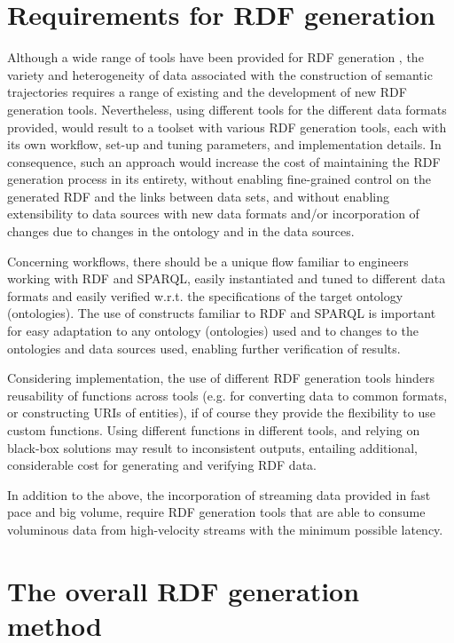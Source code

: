 \documentclass{sig-alternate}
\begin{document}
\section{Requirements for RDF generation}

Although a wide range of tools have been provided for RDF generation  \cite{_Ref490495701}, the variety and heterogeneity of data associated with the construction of semantic trajectories requires a range of existing and the development of new RDF generation tools. Nevertheless, using different tools for the different data formats provided, would result to a toolset with various RDF generation tools, each with its own workflow, set-up and tuning parameters, and implementation details. In consequence, such an approach would increase the cost of maintaining the RDF generation process in its entirety, without enabling fine-grained control on the generated RDF and the links between data sets, and without enabling extensibility to data sources with new data formats and/or incorporation of changes due to changes in the ontology and in the data sources.

Concerning workflows, there should be a unique flow familiar to engineers working with RDF and SPARQL, easily instantiated and tuned to different data formats and easily verified w.r.t. the specifications of the target ontology (ontologies). The use of constructs familiar to RDF and SPARQL is important for easy adaptation to any ontology (ontologies) used and to changes to the ontologies and data sources used, enabling further verification of results.

Considering implementation, the use of different RDF generation tools hinders reusability of functions across tools (e.g. for converting data to common formats, or constructing URIs of entities), if of course they provide the flexibility to use custom functions. Using different functions in different tools, and relying on black-box solutions may result to inconsistent outputs, entailing additional, considerable cost for generating and verifying RDF data.

In addition to the above, the incorporation of streaming data provided in fast pace and big volume, require RDF generation tools that are able to consume voluminous data from high-velocity streams with the minimum possible latency.

\section{The overall RDF generation method}
\end{document}
